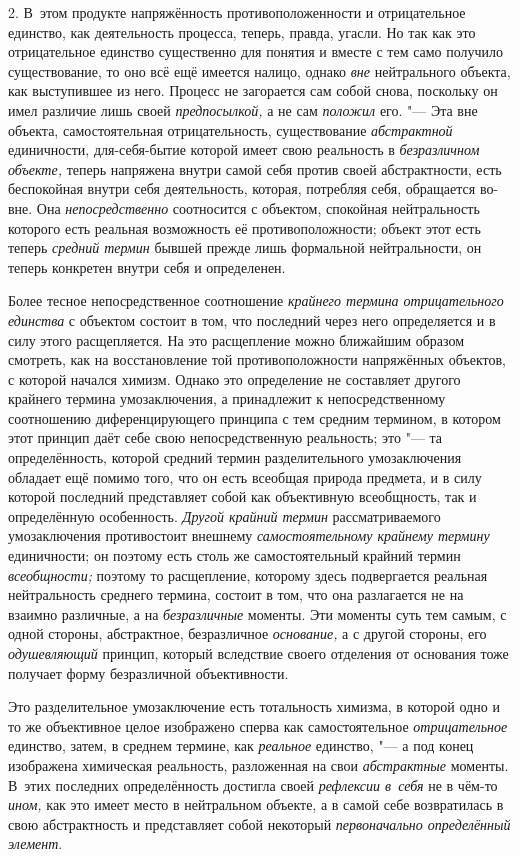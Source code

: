 2. В~этом продукте напряжённость противоположенности и
отрицательное единство, как деятельность процесса, теперь, правда, угасли.
Но так как это отрицательное единство существенно для понятия и вместе с
тем само получило существование, то оно всё ещё имеется налицо, однако
{\em вне} нейтрального
объекта, как выступившее из него. Процесс не загорается сам собой снова,
поскольку он имел различие лишь своей
{\em предпосылкой,} а не
сам {\em положил} его. "---
Эта вне объекта, самостоятельная отрицательность,
существование {\em абстрактной}
единичности, для-себя-бытие которой имеет свою реальность в
{\em безразличном объекте,}
теперь напряжена внутри самой себя против своей
абстрактности, есть беспокойная внутри себя деятельность, которая,
потребляя себя, обращается во-вне. Она
{\em непосредственно}
соотносится с объектом, спокойная нейтральность которого есть
реальная возможность её противоположности; объект этот есть теперь
{\em средний термин}
бывшей прежде лишь формальной нейтральности, он теперь
конкретен внутри себя и определенен.

Более тесное непосредственное соотношение
{\em крайнего термина отрицательного
единства} с объектом состоит в том, что последний через него
определяется и в силу этого расщепляется. На это расщепление можно
ближайшим образом смотреть, как на восстановление той противоположности
напряжённых объектов, с которой начался химизм. Однако это определение не
составляет другого крайнего термина умозаключения, а принадлежит к
непосредственному соотношению диференцирующего принципа с тем средним
термином, в котором этот принцип даёт себе свою непосредственную
реальность; это "--- та определённость, которой средний термин
разделительного умозаключения обладает ещё помимо того, что он есть
всеобщая природа предмета, и в силу которой последний представляет собой
как объективную всеобщность, так и определённую особенность.
{\em Другой крайний термин}
рассматриваемого умозаключения противостоит внешнему
{\em самостоятельному крайнему термину}
единичности; он поэтому есть столь же самостоятельный крайний
термин {\em всеобщности;}
поэтому то расщепление, которому здесь подвергается реальная
нейтральность среднего термина, состоит в том, что она разлагается не на
взаимно различные, а на
{\em безразличные}
моменты. Эти моменты суть тем самым, с одной стороны,
абстрактное, безразличное
{\em основание,} а с
другой стороны, его {\em одушевляющий}
принцип, который вследствие своего отделения
от основания тоже получает форму безразличной объективности.

Это разделительное умозаключение есть тотальность химизма, в
которой одно и то же объективное целое изображено сперва как
самостоятельное {\em отрицательное}
единство, затем, в среднем термине, как
{\em реальное} единство,
"--- а под конец изображена химическая реальность, разложенная
на свои {\em абстрактные}
моменты. В~этих последних определённость достигла своей
{\em рефлексии в~себя} не
в чём-то {\em ином,}
как это имеет место в нейтральном объекте, а в самой себе
возвратилась в свою абстрактность и представляет собой некоторый
{\em первоначально определённый
элемент}.

